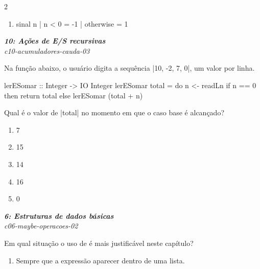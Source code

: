 \documentclass[a4paper,10pt,brazil]{article}
\begin{document}
\begin{multicols}{2}
\begin{enumerate}
  \item \begin{haskellcode}
sinal n
  | n < 0     = -1
  | otherwise = 1
\end{haskellcode}


\end{enumerate}

\begin{flushright}
  \footnotesize
  \textit{\textbf{10: Ações de E/S recursivas}}\\
  \textit{c10-acumuladores-cauda-03}\\

\end{flushright}
Na função abaixo, o usuário digita a sequência \haskellinline|10, -2, 7, 0|, um valor por linha.

\begin{haskellcode}
lerESomar :: Integer -> IO Integer
lerESomar total = do
  n <- readLn
  if n == 0
    then return total
    else lerESomar (total + n)
\end{haskellcode}

Qual é o valor de \haskellinline|total| no momento em que o caso base é alcançado?

\begin{enumerate}
  \item 7

  \item 15

  \item 14

  \item 16

  \item 0


\end{enumerate}

\begin{flushright}
  \footnotesize
  \textit{\textbf{6: Estruturas de dados básicas}}\\
  \textit{c06-maybe-operacoes-02}\\

\end{flushright}
Em qual situação o uso de  é mais justificável neste capítulo?

\begin{enumerate}
  \item Sempre que a expressão aparecer dentro de uma lista.


\end{enumerate}
\end{multicols}
\end{document}
